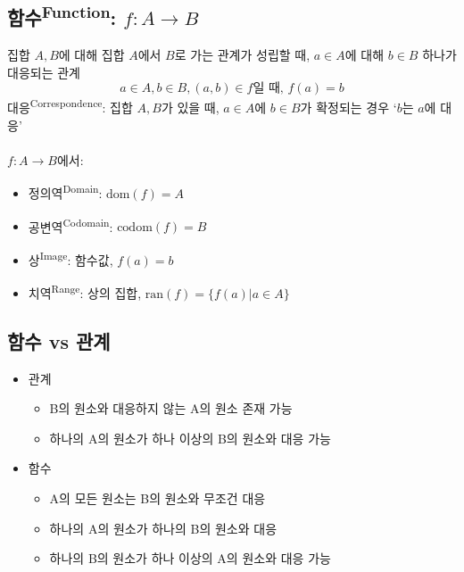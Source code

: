 \subsection{함수\textsuperscript{Function}: $f: A \to B$}
집합 $A, B$에 대해 집합 $A$에서 $B$로 가는 관계가 성립할 때,
$a \in A$에 대해 $b \in B$ 하나가 대응되는 관계\\
$$a \in A, b \in B, (a, b) \in f \text{일 때, } f(a) = b$$
대응\textsuperscript{Correspondence}:
집합 $A, B$가 있을 때, $a \in A$에 $b \in B$가 확정되는 경우 `$b$는 $a$에 대응'
\\\\
$f: A \to B$에서:
\begin{itemize}
    \item 정의역\textsuperscript{Domain}: $\mathrm{dom}(f) = A$
    \item 공변역\textsuperscript{Codomain}: $\mathrm{codom}(f) = B$
    \item 상\textsuperscript{Image}: 함수값, $f(a) = b$
    \item 치역\textsuperscript{Range}: 상의 집합, $\mathrm{ran}(f) = \{f(a)|a \in A\}$
\end{itemize}

\subsection{함수 vs 관계}
\begin{itemize}
    \item 관계
          \begin{itemize}
              \item B의 원소와 대응하지 않는 A의 원소 존재 가능
              \item 하나의 A의 원소가 하나 이상의 B의 원소와 대응 가능
          \end{itemize}
    \item 함수
          \begin{itemize}
              \item A의 모든 원소는 B의 원소와 무조건 대응
              \item 하나의 A의 원소가 하나의 B의 원소와 대응
              \item 하나의 B의 원소가 하나 이상의 A의 원소와 대응 가능
          \end{itemize}
\end{itemize}

